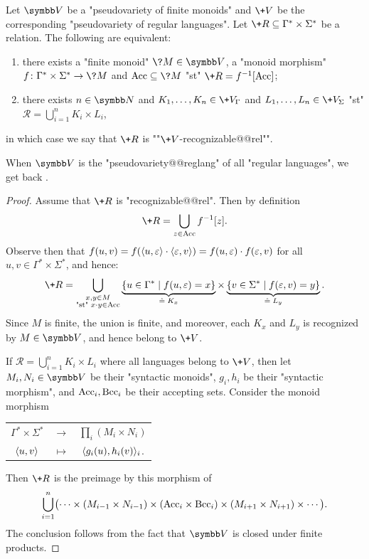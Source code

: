 \begin{proposition}
	\label{prop:Mezei-theorem-generalization}
	Let $\B{V}$ be a "pseudovariety of finite monoids"
	and $\+V$ be the corresponding "pseudovariety of regular languages".
	Let $\+R \subseteq \Gamma^* \times \Sigma^*$ be a relation.
	The following are equivalent:
	\begin{enumerate}
		\item there exists a "finite monoid" $\?M \in \B{V}$, a "monoid morphism"
		$f\colon \Gamma^* \times \Sigma^* \to \?M$ and $\Acc \subseteq \?M$
		"st" $\+R = f^{-1}[\Acc]$;
		\item there exists $n \in \N$
		and $K_1,\hdots,K_n \in \+V_{\Gamma}$ and $L_1,\hdots,L_n \in \+V_{\Sigma}$
		"st" $\mathcal{R} = \bigcup_{i=1}^n K_i \times L_i$,
	\end{enumerate}
	in which case we say that $\+R$ is \AP""$\+V$-recognizable@@rel"".
\end{proposition}

When $\B{V}$ is the "pseudovariety@@reglang" of all "regular languages",
we get back .

\begin{proof}
	Assume that $\+R$ is "recognizable@@rel". 
	Then by definition
	\[
		\+R = \bigcup_{z \in \Acc} f^{-1}[z].
	\]
	Observe then that $f(u,v) = f(\langle u,\varepsilon\rangle\cdot\langle\varepsilon,v\rangle)
	= f(u,\varepsilon)\cdot f(\varepsilon,v)$ for all $u,v \in \Gamma^* \times \Sigma^*$, and hence:
	\[
		\+R = \bigcup_{\substack{x,y \in M\\ \text{"st" } x\cdot y \in \Acc}}
		\underbrace{\{u \in \Gamma^* \mid f(u, \varepsilon) = x\}}_{\defeq \;K_x}
		\times \underbrace{\{v \in \Sigma^* \mid f(\varepsilon, v) = y\}}_{\defeq \;L_y}.
	\]
	Since $M$ is finite, the union is finite, and moreover, each $K_x$ and $L_y$ is
	recognized by $M \in \B{V}$, and hence belong to $\+V$.

	 If $\mathcal{R} = \bigcup_{i=1}^n K_i \times L_i$ 
		where all languages belong to $\+V$, then let $M_i,N_i \in \B{V}$
		be their "syntactic monoids", $g_i,h_i$ be their
		"syntactic morphism", and $\textrm{Acc}_i,\textrm{Bcc}_i$ be their accepting sets.
		Consider the monoid morphism
		\begin{center}
		\begin{tabular}{ccc}
			$\Gamma^* \times \Sigma^*$ & $\to$ & $\prod_{i}(M_i \times N_i)$ \\
			$\langle u,v\rangle$ & $\mapsto$ & $\langle g_i(u), h_i(v)\rangle_{i}$.
		\end{tabular}
		\end{center}
		Then $\+R$ is the preimage by this morphism of
		\[
			\bigcup_{i=1}^n \bigl(
			\cdots \times (M_{i-1}\times N_{i-1}) \times
			(\textrm{Acc}_i \times \textrm{Bcc}_i) \times (M_{i+1}\times N_{i+1}) \times \cdots \bigr).
		\]
		The conclusion follows from the fact that $\B{V}$ is closed under finite products.
\end{proof}

